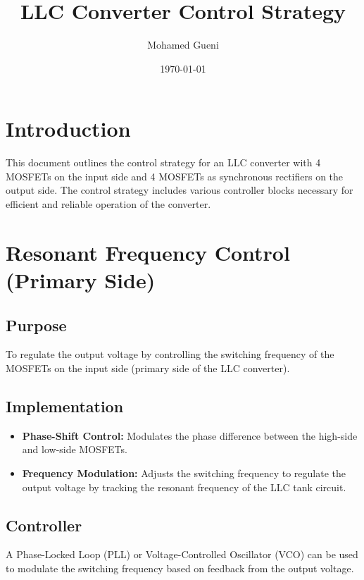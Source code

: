 \documentclass{article}
\begin{document}
\title{LLC Converter Control Strategy}
\author{Mohamed Gueni}
\date{\today}
\maketitle
\tableofcontents
\section{Introduction}
\label{sec:introduction}
This document outlines the control strategy for an LLC converter with 4 MOSFETs on the input side and 4 MOSFETs as synchronous rectifiers on the output side. The control strategy includes various controller blocks necessary for efficient and reliable operation of the converter.

\section{Resonant Frequency Control (Primary Side)}
\label{sec:resonant_frequency_control}
\subsection{Purpose}
To regulate the output voltage by controlling the switching frequency of the MOSFETs on the input side (primary side of the LLC converter).

\subsection{Implementation}
\begin{itemize}
    \item \textbf{Phase-Shift Control:} Modulates the phase difference between the high-side and low-side MOSFETs.
    \item \textbf{Frequency Modulation:} Adjusts the switching frequency to regulate the output voltage by tracking the resonant frequency of the LLC tank circuit.
\end{itemize}

\subsection{Controller}
A Phase-Locked Loop (PLL) or Voltage-Controlled Oscillator (VCO) can be used to modulate the switching frequency based on feedback from the output voltage.
\end{document}
